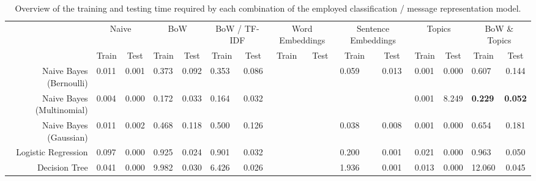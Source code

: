 \documentclass[letterpaper]{article}
\begin{document}
\begin{landscape}
	\begin{table}[t!]
		\centering
		\caption{Overview of the training and testing time required by each combination of the employed classification / message representation model.}
		\label{tb: time}
		\begin{tabular}{@{}r|lclclclclclclc@{}}
			\toprule
			                          & \multicolumn{2}{c}{Naive}         & \multicolumn{2}{c}{BoW}           & \multicolumn{2}{c}{BoW / TF-IDF}  & \multicolumn{2}{c}{Word Embeddings} & \multicolumn{2}{c}{Sentence Embeddings} & \multicolumn{2}{c}{Topics}             & \multicolumn{2}{c}{BoW \& Topics}            \\
			\multicolumn{1}{l|}{}     & \multicolumn{1}{c}{Train} & Test  & \multicolumn{1}{c}{Train} & Test  & \multicolumn{1}{c}{Train} & Test  & \multicolumn{1}{c}{Train} & Test    & \multicolumn{1}{c}{Train}     & Test    & \multicolumn{1}{c}{Train}    & Test    & \multicolumn{1}{c}{Train}    & Test          \\ \midrule
			Naive Bayes (Bernoulli)   & 0.011                     & 0.001 & 0.373                     & 0.092 & 0.353                     & 0.086 &                           &         & 0.059                         & 0.013   & 0.001                        & 0.000   & 0.607                        & 0.144         \\
			Naive Bayes (Multinomial) & 0.004                     & 0.000 & 0.172                     & 0.033 & 0.164                     & 0.032 &                           &         &                               &         & 0.001                        & 8.249   & \textbf{0.229}               & \textbf{0.052}\\
			Naive Bayes (Gaussian)    & 0.011                     & 0.002 & 0.468                     & 0.118 & 0.500                     & 0.126 &                           &         & 0.038                         & 0.008   & 0.001                        & 0.000   & 0.654                        & 0.181         \\
			Logistic Regression       & 0.097                     & 0.000 & 0.925                     & 0.024 & 0.901                     & 0.032 &                           &         & 0.200                         & 0.001   & 0.021                        & 0.000   & 0.963                        & 0.050         \\
			Decision Tree             & 0.041                     & 0.000 & 9.982                     & 0.030 & 6.426                     & 0.026 &                           &         & 1.936                         & 0.001   & 0.013                        & 0.000   & 12.060                       & 0.045         \\

\end{tabular}
\end{table}
\end{landscape}
\end{document}

